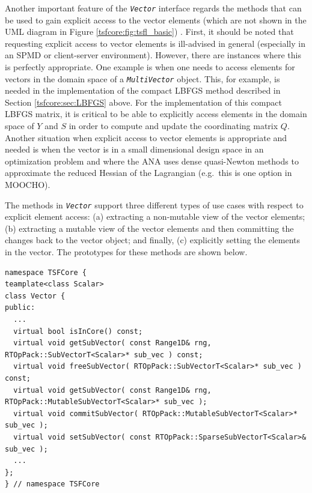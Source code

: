 Another important feature of the \texttt{\textit{Vector}} interface
regards the methods that can be used to gain explicit access to the
vector elements (which are not shown in the UML diagram in Figure
\ref{tsfcore:fig:tsfl_basic}) .  First, it should be noted that requesting
explicit access to vector elements is ill-advised in general
(especially in an SPMD or client-server environment).  However, there
are instances where this is perfectly appropriate.  One example is
when one needs to access elements for vectors in the domain space of a
\texttt{\textit{Multi\-Vector}} object.  This, for example, is needed in the
implementation of the compact LBFGS method described in Section
\ref{tsfcore:sec:LBFGS} above.  For the implementation of this compact
LBFGS matrix, it is critical to be able to explicitly access elements
in the domain space of $Y$ and $S$ in order to compute and update the
coordinating matrix $Q$.  Another situation when explicit access to
vector elements is appropriate and needed is when the vector is in a
small dimensional design space in an optimization problem and where
the ANA uses dense quasi-Newton methods to approximate the reduced
Hessian of the Lagrangian (e.g.~this is one option in MOOCHO).

The methods in \texttt{\textit{Vector}} support three different types
of use cases with respect to explicit element access: (a) extracting a
non-mutable view of the vector elements; (b) extracting a mutable view
of the vector elements and then committing the changes back to the
vector object; and finally, (c) explicitly setting the elements in the
vector.  The prototypes for these methods are shown below.

{\scriptsize\begin{verbatim}
namespace TSFCore {
teamplate<class Scalar>
class Vector {
public:
  ...
  virtual bool isInCore() const;
  virtual void getSubVector( const Range1D& rng, RTOpPack::SubVectorT<Scalar>* sub_vec ) const;
  virtual void freeSubVector( RTOpPack::SubVectorT<Scalar>* sub_vec ) const;
  virtual void getSubVector( const Range1D& rng, RTOpPack::MutableSubVectorT<Scalar>* sub_vec );
  virtual void commitSubVector( RTOpPack::MutableSubVectorT<Scalar>* sub_vec );
  virtual void setSubVector( const RTOpPack::SparseSubVectorT<Scalar>& sub_vec );
  ...
};
} // namespace TSFCore
\end{verbatim}}

